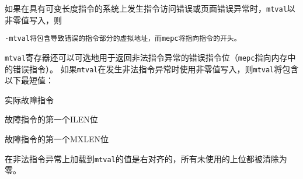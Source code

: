如果在具有可变长度指令的系统上发生指令访问错误或页面错误异常时，{\tt mtval}以非零值写入，则{\tt-mtval将包含导致错误的指令部分的虚拟地址，而{\tt mepc}将指向指令的开头。

{\tt mtval}寄存器还可以可选地用于返回非法指令异常的错误指令位（{\tt mepc}指向内存中的错误指令）。
如果{\tt mtval}在发生非法指令异常时使用非零值写入，则{\tt mtval}将包含以下最短值：
\begin{compactitem}
\item 实际故障指令
\item 故障指令的第一个ILEN位
\item 故障指令的第一个MXLEN位
\end{compactitem}
\iffalse
The value loaded into {\tt mtval} on an illegal-instruction exception is
right-justified and all unused upper bits are cleared to zero.
\fi
在非法指令异常上加载到{\tt mtval}的值是右对齐的，所有未使用的上位都被清除为零。

\iffalse
\begin{commentary}
  Capturing the faulting instruction in {\tt mtval} reduces the
  overhead of instruction emulation, potentially avoiding several
  partial instruction loads if the instruction is misaligned, and
  likely data cache misses or slow uncached accesses when loads are
  used to fetch the instruction into a data register.  There is also a
  problem of atomicity if another agent is manipulating the
  instruction memory, as might occur in a dynamic translation system.

  A requirement is that the entire instruction (or at least the first
  MXLEN bits) are fetched into {\tt mtval} before taking the trap.
  This should not constrain implementations, which would typically
  fetch the entire instruction before attempting to decode the
  instruction, and avoids complicating software handlers.

  A value of zero in {\tt mtval} signifies either that the feature is
  not supported, or an illegal zero instruction was fetched.  A load
  from the instruction memory pointed to by {\tt mepc} can be used to
  distinguish these two cases (or alternatively, the system
  configuration information can be interrogated to install the
  appropriate trap handling before runtime).
\end{commentary}
\fi

}
